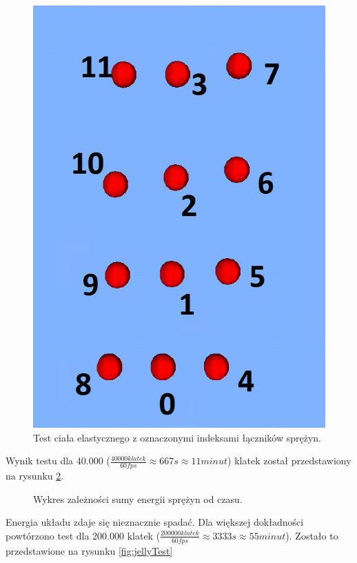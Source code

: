 \begin{figure}
\centering
\includegraphics[scale=0.5]{img/JellyScene.png}
\caption{Test ciała elastycznego z oznaczonymi indeksami łączników sprężyn.}
\label{fig:JellyScene}
\end{figure}

Wynik testu dla 40.000 ($ \frac{40000 klatek}{60 fps} \approx 667 s \approx 11
minut $) klatek został przedstawiony na rysunku \ref{fig:jellyTest2}.

\begin{figure}
\centering

\caption{Wykres zależności sumy energii sprężyn od czasu.}
\label{fig:jellyTest2}
\end{figure}

Energia układu zdaje się nieznacznie spadać. Dla większej dokładności powtórzono
test dla 200.000 klatek ($ \frac{200000 klatek}{60 fps} \approx 3333 s \approx
55 minut $). Zostało to przedstawione na rysunku \ref{fig:jellyTest}

